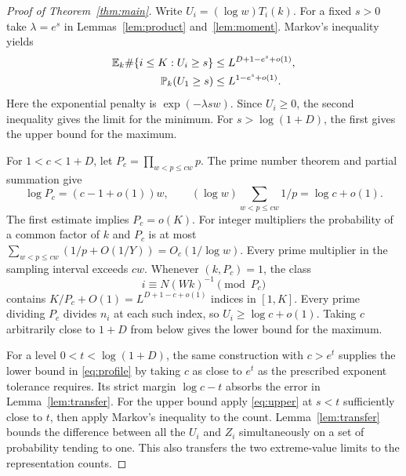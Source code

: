 \begin{proof}[Proof of Theorem~\ref{thm:main}]
Write \(U_i=(\log w)T_i(k)\). For a fixed \(s>0\) take
\(\lambda=e^s\) in Lemmas~\ref{lem:product} and~\ref{lem:moment}.
Markov's inequality yields
\begin{align}
 \mathbb E_k\#\{i\le K:U_i\ge s\}
   &\le L^{D+1-e^s+o(1)}, \label{eq:upper}\\
 \mathbb P_k(U_1\ge s)&\le L^{1-e^s+o(1)}. \nonumber
\end{align}
Here the exponential penalty is \(\exp(-\lambda sw)\).
Since \(U_i\ge0\), the second inequality gives the limit for the minimum.
For \(s>\log(1+D)\), the first gives the upper bound for the maximum.

For \(1<c<1+D\), let \(P_c=\prod_{w<p\le cw}p\). The prime number theorem
and partial summation give
\[
 \log P_c=(c-1+o(1))w,\qquad
 (\log w)\sum_{w<p\le cw}1/p=\log c+o(1).
\]
The first estimate implies \(P_c=o(K)\). For integer multipliers the
probability of a common factor of \(k\) and \(P_c\) is at most
\(\sum_{w<p\le cw}(1/p+O(1/Y))=O_c(1/\log w)\). Every prime multiplier
in the sampling interval exceeds \(cw\). Whenever \((k,P_c)=1\), the class
\[
             i\equiv N(Wk)^{-1}\pmod{P_c}
\]
contains \(K/P_c+O(1)=L^{D+1-c+o(1)}\) indices in \([1,K]\).
Every prime dividing \(P_c\) divides \(n_i\) at each such index, so
\(U_i\ge\log c+o(1)\). Taking \(c\) arbitrarily close to \(1+D\) from
below gives the lower bound for the maximum.

For a level \(0<t<\log(1+D)\), the same construction with \(c>e^t\)
supplies the lower bound in \eqref{eq:profile} by taking \(c\) as close to
\(e^t\) as the prescribed exponent tolerance requires. Its strict margin
\(\log c-t\) absorbs the error in Lemma~\ref{lem:transfer}. For the upper
bound apply \eqref{eq:upper} at \(s<t\) sufficiently close to \(t\),
then apply Markov's inequality to the count. Lemma~\ref{lem:transfer}
bounds the difference between all the \(U_i\) and \(Z_i\) simultaneously
on a set of probability tending to one. This also transfers the two
extreme-value limits to the representation counts.
\end{proof}
